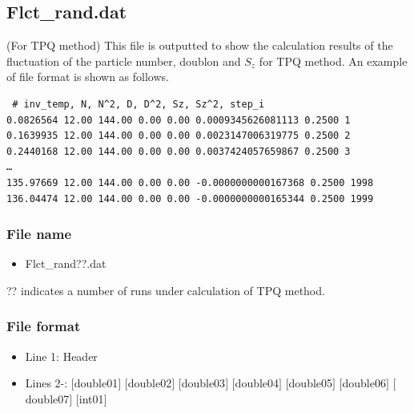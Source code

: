 \newpage
\subsection{Flct\_rand.dat}
\label{Subsec:flctrand}
(For TPQ method) This file is outputted to show the calculation results of the fluctuation of the particle number, doublon and $S_z$ for TPQ method.
An example of file format is shown as follows.\\

\begin{minipage}{15cm}
\begin{screen}
\begin{verbatim}
 # inv_temp, N, N^2, D, D^2, Sz, Sz^2, step_i
0.0826564 12.00 144.00 0.00 0.00 0.0009345626081113 0.2500 1
0.1639935 12.00 144.00 0.00 0.00 0.0023147006319775 0.2500 2
0.2440168 12.00 144.00 0.00 0.00 0.0037424057659867 0.2500 3
…
135.97669 12.00 144.00 0.00 0.00 -0.0000000000167368 0.2500 1998
136.04474 12.00 144.00 0.00 0.00 -0.0000000000165344 0.2500 1999
\end{verbatim}
\end{screen}
\end{minipage}

\subsubsection{File name}
 \begin{itemize}
   \item Flct\_rand??.dat
  \end{itemize}
  ?? indicates a number of runs under calculation of TPQ method.

\subsubsection{File format}
\begin{itemize}
   \item Line 1: Header
   \item Lines 2-: $[$double01$]$ $[$double02$]$ $[$double03$]$ $[$double04$]$ $[$double05$]$ $[$double06$]$ $[$double07$]$ $[$int01$]$
  \end{itemize}

